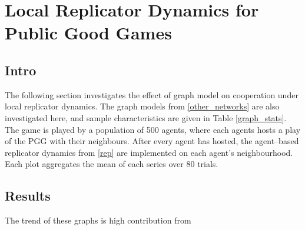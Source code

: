 \section{Local Replicator Dynamics for Public Good Games}
\subsection{Intro}
The following section investigates the effect of graph model on cooperation under local replicator dynamics. The graph models from \ref{other_networks} are also investigated here, and sample characteristics are given in Table \ref{graph_stats}. The game is played by a population of 500 agents, where each agents hosts a play of the PGG with their neighbours. After every agent has hosted, the agent--based replicator dynamics from \eqref{rep} are implemented on each agent's neighbourhood. Each plot aggregates the mean of each series over 80 trials.  \\
\subsection{Results}

The trend of these graphs is high contribution from 


